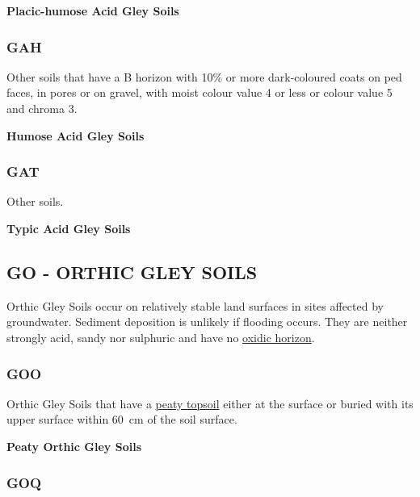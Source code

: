 \documentclass[
  letterpaper,
  DIV=11,
  numbers=noendperiod]{scrreprt}
\begin{document}
\textbf{Placic-humose Acid Gley Soils}

\hypertarget{sec-key-GAH}{%
\subsubsection{\texorpdfstring{\textbf{GAH}}{GAH}}\label{sec-key-GAH}}

Other soils that have a B horizon with 10\% or more dark-coloured coats
on ped faces, in pores or on gravel, with moist colour value 4 or less
or colour value 5 and chroma 3.

\textbf{Humose Acid Gley Soils}

\hypertarget{sec-key-GAT}{%
\subsubsection{\texorpdfstring{\textbf{GAT}}{GAT}}\label{sec-key-GAT}}

Other soils.

\textbf{Typic Acid Gley Soils}

\hypertarget{sec-GO}{%
\subsection{\texorpdfstring{\textbf{GO} - ORTHIC GLEY
SOILS}{GO - ORTHIC GLEY SOILS}}\label{sec-GO}}

Orthic Gley Soils occur on relatively stable land surfaces in sites
affected by groundwater. Sediment deposition is unlikely if flooding
occurs. They are neither strongly acid, sandy nor sulphuric and have no
\protect\hyperlink{sec-diag-oxh}{oxidic horizon}.

\hypertarget{sec-key-GOO}{%
\subsubsection{\texorpdfstring{\textbf{GOO}}{GOO}}\label{sec-key-GOO}}

Orthic Gley Soils that have a \protect\hyperlink{sec-diag-pts}{peaty
topsoil} either at the surface or buried with its upper surface within
60~cm of the soil surface.

\textbf{Peaty Orthic Gley Soils}

\hypertarget{sec-key-GOQ}{%
\subsubsection{\texorpdfstring{\textbf{GOQ}}{GOQ}}\label{sec-key-GOQ}}
\end{document}
